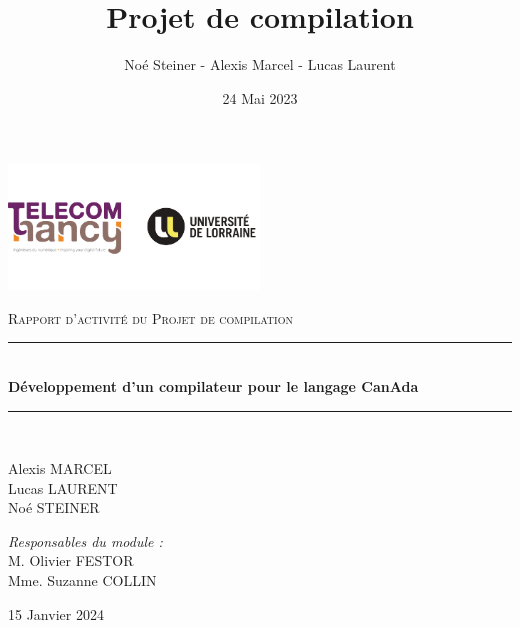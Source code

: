 \documentclass[french,a4paper]{article}
\title{Projet de compilation}
\author{Noé Steiner - Alexis Marcel - Lucas Laurent}
\date{24 Mai 2023}
\newcommand{\HRule}{\rule{\linewidth}{0.5mm}}
\begin{document}

    \begin{titlepage}
        \begin{center}

            \includegraphics[width=0.5\textwidth]{tele_univ}

            \textsc{\Large Rapport d'activité du Projet de compilation}\\[1.5cm]

            \HRule \\[0.4cm]
            { \huge \bfseries Développement d'un compilateur pour le langage CanAda\\[0.4cm] }

            \HRule \\[2cm]

            \begin{minipage}{0.4\textwidth}
                \begin{flushleft} \large
                Alexis MARCEL\\
                Lucas LAURENT\\
                Noé STEINER\\
                \end{flushleft}
            \end{minipage}
            \begin{minipage}{0.4\textwidth}
                \begin{flushright} \large
                \emph{Responsables du module :}\\
                M. Olivier FESTOR\\
                Mme. Suzanne COLLIN\\
                \end{flushright}
            \end{minipage}

            \vfill

            {\large 15 Janvier 2024}

        \end{center}
    \end{titlepage}
    \newpage
    \tableofcontents
    \newpage
\end{document}
